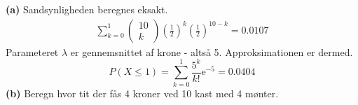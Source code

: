 \documentclass[12pt,a4paper,draft]{report}
\begin{document}
\textbf{(a)} Sandsynligheden beregnes eksakt.
\begin{align*}
\sum_{k=0}^1\begin{pmatrix}
10\\
k
\end{pmatrix}
\left(\frac{1}{2}\right)^k\left(\frac{1}{2}\right)^{10-k}=0.0107
\end{align*}
Parameteret $\lambda$ er gennemsnittet af krone - altså 5. Approksimationen er dermed.
\begin{equation}
P(X\leq 1)=\sum_{k=0}^1\frac{5^k}{k!}\mathrm{e}^{-5}=0.0404
\end{equation}
\textbf{(b)} Beregn hvor tit der fås 4 kroner ved 10 kast med 4 mønter.
\end{document}
